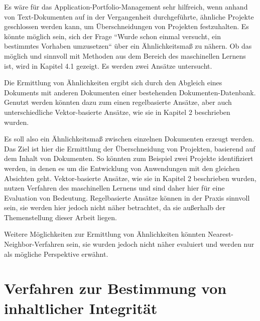Es wäre für das Application-Portfolio-Management sehr hilfreich, wenn anhand von Text-Dokumenten auf in der Vergangenheit durchgeführte, ähnliche Projekte geschlossen werden kann, um Überschneidungen von Projekten festzuhalten. Es könnte möglich sein, sich der Frage ``Wurde schon einmal versucht, ein bestimmtes Vorhaben umzusetzen`` über ein Ähnlichkeitsmaß zu nähern. Ob das möglich und sinnvoll mit Methoden aus dem Bereich des maschinellen Lernens ist, wird in Kapitel 4.1 gezeigt. Es werden zwei Ansätze untersucht.

Die Ermittlung von Ähnlichkeiten ergibt sich durch den Abgleich eines Dokuments mit anderen Dokumenten einer bestehenden Dokumenten-Datenbank. Genutzt werden könnten dazu zum einen regelbasierte Ansätze, aber auch unterschiedliche Vektor-basierte Ansätze, wie sie in Kapitel 2 beschrieben wurden. 

Es soll also ein Ähnlichkeitsmaß zwischen einzelnen Dokumenten erzeugt werden. Das Ziel ist hier die Ermittlung der Überschneidung von Projekten, basierend auf dem Inhalt von Dokumenten. So könnten zum Beispiel zwei Projekte identifiziert werden, in denen es um die Entwicklung von Anwendungen mit den gleichen Absichten geht. Vektor-basierte Ansätze, wie sie in Kapitel 2 beschrieben wurden, nutzen Verfahren des maschinellen Lernens und sind daher hier für eine Evaluation von Bedeutung. Regelbasierte Ansätze können in der Praxis sinnvoll sein, sie werden hier jedoch nicht näher betrachtet, da sie außerhalb der Themenstellung dieser Arbeit liegen.

Weitere Möglichkeiten zur Ermittlung von Ähnlichkeiten könnten Nearest-Neighbor-Verfahren sein, sie wurden jedoch nicht näher evaluiert und werden nur als mögliche Perspektive erwähnt.

\section{Verfahren zur Bestimmung von inhaltlicher Integrität}

